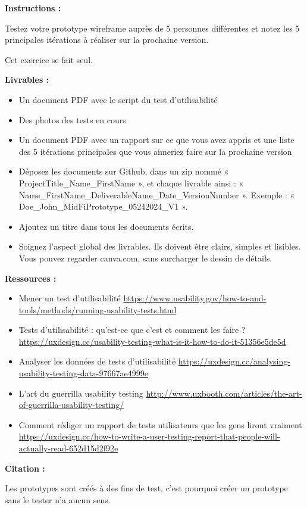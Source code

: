 \makeheaderfiles

\textbf{Instructions :}

Testez votre prototype wireframe auprès de 5 personnes différentes et notez les 5 principales itérations à réaliser sur la prochaine version.

Cet exercice se fait seul.

\textbf{Livrables :}

\begin{itemize}
\item Un document PDF avec le script du test d'utilisabilité
\item Des photos des tests en cours
\item Un document PDF avec un rapport sur ce que vous avez appris et une liste des 5 itérations principales que vous aimeriez faire sur la prochaine version
\item Déposez les documents sur Github, dans un zip nommé « ProjectTitle\_Name\_FirstName », et chaque livrable ainsi : « Name\_FirstName\_DeliverableName\_Date\_VersionNumber ». Exemple : « Doe\_John\_MidFiPrototype\_05242024\_V1 ».
\item Ajoutez un titre dans tous les documents écrits.
\item Soignez l'aspect global des livrables. Ils doivent être clairs, simples et lisibles. Vous pouvez regarder canva.com, sans surcharger le dessin de détails.
\end{itemize}

\textbf{Ressources :}

\begin{itemize}
\item Mener un test d'utilisabilité \url{https://www.usability.gov/how-to-and-tools/methods/running-usability-tests.html}
\item Tests d'utilisabilité : qu'est-ce que c'est et comment les faire ? \url{https://uxdesign.cc/usability-testing-what-is-it-how-to-do-it-51356e5de5d}
\item Analyser les données de tests d'utilisabilité \url{https://uxdesign.cc/analysing-usability-testing-data-97667ae4999e}
\item L'art du guerrilla usability testing \url{http://www.uxbooth.com/articles/the-art-of-guerrilla-usability-testing/}
\item Comment rédiger un rapport de tests utilisateurs que les gens liront vraiment \url{https://uxdesign.cc/how-to-write-a-user-testing-report-that-people-will-actually-read-652d15d2f92e}
\end{itemize}

\textbf{Citation :}

Les prototypes sont créés à des fins de test, c'est pourquoi créer un prototype sans le tester n'a aucun sens.

